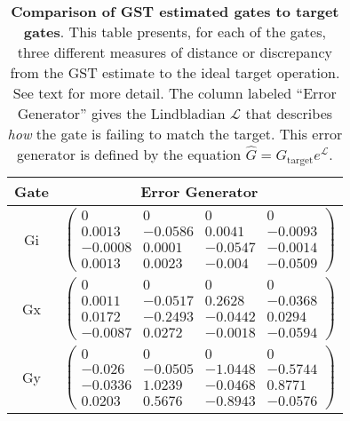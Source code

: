 {\begin{table}[h]
\begin{center}
\vspace{2em}
\begin{tabular}[l]{|c|c|}
\hline
Gate & Error Generator \\ \hline
Gi & $ \left(\!\!\begin{array}{cccc}
0 & 0 & 0 & 0 \\ 
0.0013 & -0.0586 & 0.0041 & -0.0093 \\ 
-0.0008 & 0.0001 & -0.0547 & -0.0014 \\ 
0.0013 & 0.0023 & -0.004 & -0.0509
 \end{array}\!\!\right) $
 \\ \hline
Gx & $ \left(\!\!\begin{array}{cccc}
0 & 0 & 0 & 0 \\ 
0.0011 & -0.0517 & 0.2628 & -0.0368 \\ 
0.0172 & -0.2493 & -0.0442 & 0.0294 \\ 
-0.0087 & 0.0272 & -0.0018 & -0.0594
 \end{array}\!\!\right) $
 \\ \hline
Gy & $ \left(\!\!\begin{array}{cccc}
0 & 0 & 0 & 0 \\ 
-0.026 & -0.0505 & -1.0448 & -0.5744 \\ 
-0.0336 & 1.0239 & -0.0468 & 0.8771 \\ 
0.0203 & 0.5676 & -0.8943 & -0.0576
 \end{array}\!\!\right) $
 \\ \hline
\end{tabular}

\caption{\textbf{Comparison of GST estimated gates to target gates}.  This table presents, for each of the gates, three different measures of distance or discrepancy from the GST estimate to the ideal target operation.  See text for more detail.  The column labeled ``Error Generator'' gives the Lindbladian $\mathcal{L}$ that describes \emph{how} the gate is failing to match the target.  This error generator is defined by the equation $\hat{G} = G_{\mathrm{target}}e^{\mathcal{L}}$. \label{bestCPTPGatesetVsTargetTable}}
\end{center}
\end{table}

}
